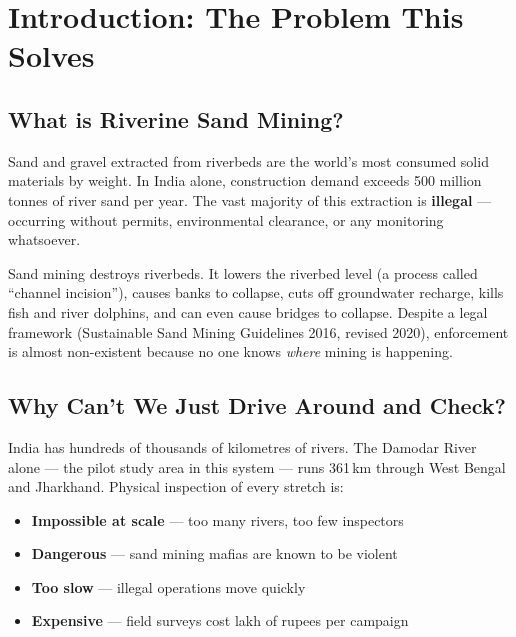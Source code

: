 \documentclass[12pt, a4paper]{article}
\begin{document}
\tableofcontents
\newpage

\section{Introduction: The Problem This Solves}

\subsection{What is Riverine Sand Mining?}

Sand and gravel extracted from riverbeds are the world's most consumed
solid materials by weight. In India alone, construction demand exceeds
500 million tonnes of river sand per year. The vast majority of this
extraction is \textbf{illegal} --- occurring without permits,
environmental clearance, or any monitoring whatsoever.

Sand mining destroys riverbeds. It lowers the riverbed level (a process
called ``channel incision''), causes banks to collapse, cuts off
groundwater recharge, kills fish and river dolphins, and can even cause
bridges to collapse. Despite a legal framework (Sustainable Sand Mining
Guidelines 2016, revised 2020), enforcement is almost non-existent
because no one knows \emph{where} mining is happening.

\subsection{Why Can't We Just Drive Around and Check?}

India has hundreds of thousands of kilometres of rivers. The Damodar
River alone --- the pilot study area in this system --- runs
361\,km through West Bengal and Jharkhand. Physical inspection of every
stretch is:

\begin{itemize}[noitemsep]
  \item \textbf{Impossible at scale} --- too many rivers, too few inspectors
  \item \textbf{Dangerous} --- sand mining mafias are known to be violent
  \item \textbf{Too slow} --- illegal operations move quickly
  \item \textbf{Expensive} --- field surveys cost lakh of rupees per campaign
\end{itemize}
\end{document}
